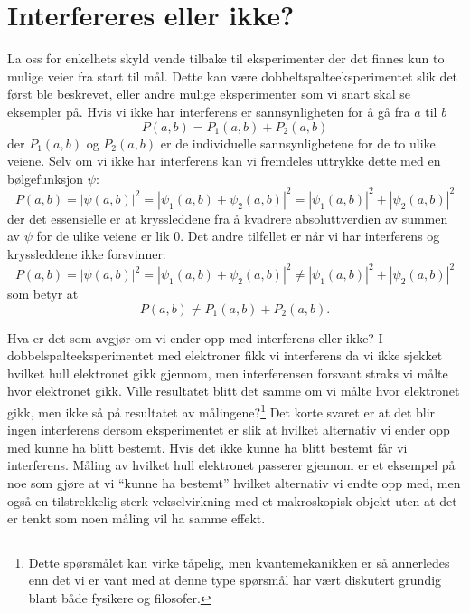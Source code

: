 \section{Interfereres eller ikke?}
La oss for enkelhets skyld vende tilbake til eksperimenter der det finnes kun to mulige veier fra start til mål. Dette kan være dobbeltspalteeksperimentet slik det først ble beskrevet, eller andre mulige eksperimenter som vi snart skal se eksempler på. Hvis vi ikke har interferens er sannsynligheten for å gå fra $a$ til $b$ 
\begin{displaymath}
	P(a,b) = P_1(a,b) + P_2(a,b)
\end{displaymath}
der $P_1(a,b)$ og $P_2(a,b)$ er de individuelle sannsynlighetene for de to ulike veiene. Selv om vi ikke har interferens kan vi fremdeles uttrykke dette med en bølgefunksjon $\psi$:
\begin{displaymath}
	P(a,b) = |\psi(a,b)|^2 = |\psi_1(a,b)+\psi_2(a,b)|^2 = |\psi_1(a,b)|^2 + |\psi_2(a,b)|^2
\end{displaymath}
der det essensielle er at kryssleddene fra å kvadrere absoluttverdien av summen av $\psi$ for de ulike veiene er lik 0. Det andre tilfellet er når vi har interferens og kryssleddene ikke forsvinner: 
\begin{displaymath}
	P(a,b) = |\psi(a,b)|^2 = |\psi_1(a,b)+\psi_2(a,b)|^2 \neq |\psi_1(a,b)|^2 + |\psi_2(a,b)|^2
\end{displaymath}
som betyr at 
\begin{displaymath}
	P(a,b) \neq P_1(a,b) + P_2(a,b).
\end{displaymath}

Hva er det som avgjør om vi ender opp med interferens eller ikke? I dobbelspalteeksperimentet med elektroner fikk vi interferens da vi ikke sjekket hvilket hull elektronet gikk gjennom, men interferensen forsvant straks vi målte hvor elektronet gikk. Ville resultatet blitt det samme om vi målte hvor elektronet gikk, men ikke så på resultatet av målingene?\footnote{Dette spørsmålet kan virke tåpelig, men kvantemekanikken er så annerledes enn det vi er vant med at denne type spørsmål har vært diskutert grundig blant både fysikere og filosofer.} Det korte svaret er at det blir ingen interferens dersom eksperimentet er slik at hvilket alternativ vi ender opp med kunne ha blitt bestemt. Hvis det ikke kunne ha blitt bestemt får vi interferens. Måling av hvilket hull elektronet passerer gjennom er et eksempel på noe som gjøre at vi ``kunne ha bestemt'' hvilket alternativ vi endte opp med, men også en tilstrekkelig sterk vekselvirkning med et makroskopisk objekt uten at det er tenkt som noen måling vil ha samme effekt.

